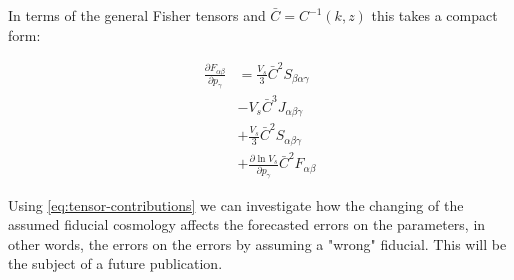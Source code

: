 In terms of the general Fisher tensors and $\bar{C}=C^{-1}(k,z)$
this takes a compact form:

\begin{align}\label{eq:tensor-contributions}
\frac{\partial F_{\alpha\beta}}{\partial p_{\gamma}} & =\frac{V_{s}}{3}\bar{C}^{2}S_{\beta\alpha\gamma}\\
& -V_{s}\bar{C}^{3}J_{\alpha\beta\gamma}\nonumber \\
& +\frac{V_{s}}{3}\bar{C}^{2}S_{\alpha\beta\gamma}\nonumber \\
& +\frac{\partial\ln V_{s}}{\partial p_{\gamma}}\bar{C}^{2}F_{\alpha\beta}\nonumber 
\end{align}


Using \cref{eq:tensor-contributions} we can investigate how the changing of the assumed fiducial 
cosmology affects the forecasted errors on the parameters, in other words, the errors on the errors by assuming
a "wrong" fiducial.
This will be the subject of a future publication.



